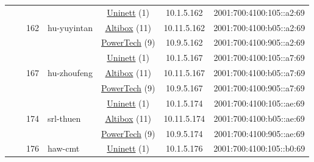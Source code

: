 \begin{small}
\begin{center}
\begin{longtable}{|c|c|c|c|c|c|c|c|}
  &  & \multirow{3}{*}{\tiny{162}} & \multicolumn{1}{|l|}{\multirow{3}{*}{\tiny{hu-yuyintan}}} & \multicolumn{2}{|c|}{\tiny{\href{https://www.uninett.no}{Uninett} (1)}} & \tiny{10.1.5.162} & \tiny{2001:700:4100:105::a2:69} \\* \cline{5-5}\cline{6-6}\cline{7-7}\cline{8-8}
  &  &  &  & \multicolumn{2}{|c|}{\tiny{\href{https://www.altibox.no}{Altibox} (11)}} & \tiny{10.11.5.162} & \tiny{2001:700:4100:b05::a2:69} \\* \cline{5-5}\cline{6-6}\cline{7-7}\cline{8-8}
  &  &  &  & \multicolumn{2}{|c|}{\tiny{\href{http://www.powertech.no}{PowerTech} (9)}} & \tiny{10.9.5.162} & \tiny{2001:700:4100:905::a2:69} \\* \cline{3-3}\cline{4-4}\cline{5-5}\cline{6-6}\cline{7-7}\cline{8-8}
  &  & \multirow{3}{*}{\tiny{167}} & \multicolumn{1}{|l|}{\multirow{3}{*}{\tiny{hu-zhoufeng}}} & \multicolumn{2}{|c|}{\tiny{\href{https://www.uninett.no}{Uninett} (1)}} & \tiny{10.1.5.167} & \tiny{2001:700:4100:105::a7:69} \\* \cline{5-5}\cline{6-6}\cline{7-7}\cline{8-8}
  &  &  &  & \multicolumn{2}{|c|}{\tiny{\href{https://www.altibox.no}{Altibox} (11)}} & \tiny{10.11.5.167} & \tiny{2001:700:4100:b05::a7:69} \\* \cline{5-5}\cline{6-6}\cline{7-7}\cline{8-8}
  &  &  &  & \multicolumn{2}{|c|}{\tiny{\href{http://www.powertech.no}{PowerTech} (9)}} & \tiny{10.9.5.167} & \tiny{2001:700:4100:905::a7:69} \\* \cline{3-3}\cline{4-4}\cline{5-5}\cline{6-6}\cline{7-7}\cline{8-8}
  &  & \multirow{3}{*}{\tiny{174}} & \multicolumn{1}{|l|}{\multirow{3}{*}{\tiny{srl-thuen}}} & \multicolumn{2}{|c|}{\tiny{\href{https://www.uninett.no}{Uninett} (1)}} & \tiny{10.1.5.174} & \tiny{2001:700:4100:105::ae:69} \\* \cline{5-5}\cline{6-6}\cline{7-7}\cline{8-8}
  &  &  &  & \multicolumn{2}{|c|}{\tiny{\href{https://www.altibox.no}{Altibox} (11)}} & \tiny{10.11.5.174} & \tiny{2001:700:4100:b05::ae:69} \\* \cline{5-5}\cline{6-6}\cline{7-7}\cline{8-8}
  &  &  &  & \multicolumn{2}{|c|}{\tiny{\href{http://www.powertech.no}{PowerTech} (9)}} & \tiny{10.9.5.174} & \tiny{2001:700:4100:905::ae:69} \\* \cline{3-3}\cline{4-4}\cline{5-5}\cline{6-6}\cline{7-7}\cline{8-8}
  &  & \multirow{3}{*}{\tiny{176}} & \multicolumn{1}{|l|}{\multirow{3}{*}{\tiny{haw-cmt}}} & \multicolumn{2}{|c|}{\tiny{\href{https://www.uninett.no}{Uninett} (1)}} & \tiny{10.1.5.176} & \tiny{2001:700:4100:105::b0:69} \\* \cline{5-5}\cline{6-6}\cline{7-7}\cline{8-8}

\end{longtable}
\end{center}
\end{small}
